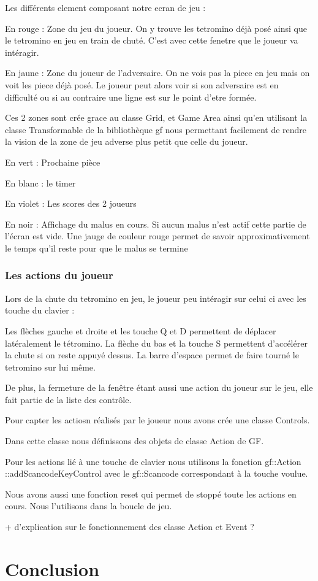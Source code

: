 \documentclass[a4paper, 12pt]{article}
\begin{document}
			Les différents element composant notre ecran de jeu : 

			En rouge : Zone du jeu du joueur. On y trouve les tetromino déjà posé ainsi que le tetromino en jeu en train de chuté. C’est avec cette fenetre que le joueur va intéragir.

			En jaune : Zone du joueur de l’adversaire. On ne vois pas la piece en jeu mais on voit les piece déjà posé. Le joueur peut alors voir si son adversaire est en difficulté ou si au contraire une ligne est sur le point d’etre formée.


			Ces 2 zones sont crée grace au classe Grid, et Game Area ainsi qu’en utilisant la classe Transformable de la bibliothèque gf nous permettant facilement de rendre la vision de la zone de jeu adverse plus petit que celle du joueur.

			En vert : Prochaine pièce

			En blanc : le timer

			En violet : Les scores des 2 joueurs

			En noir : Affichage du malus en cours. Si aucun malus n’est actif cette partie de l’écran est vide. Une jauge de couleur rouge permet de savoir approximativement le temps qu’il reste pour que le malus se termine




		\subsubsection{Les actions du joueur}

			Lors de la chute du tetromino en jeu, le joueur peu intéragir sur celui ci avec les touche du clavier :

			Les flèches gauche et droite et les touche Q et D permettent de déplacer latéralement le tétromino.
			La flèche du bas et la touche S permettent d’accélérer la chute si on reste appuyé dessus.
			La barre d’espace permet de faire tourné le tetromino sur lui même.

			De plus, la fermeture de la fenêtre étant aussi une action du joueur sur le jeu, elle fait partie de la liste des contrôle.


			Pour capter les actiosn réalisés par le joueur nous avons crée une classe Controls.

			Dans cette classe nous définissons des objets de classe Action de GF.

			Pour les actions lié à une touche de clavier nous utilisons la fonction gf::Action ::addScancodeKeyControl avec le gf::Scancode correspondant à la touche voulue.

			Nous avons aussi une fonction reset qui permet de stoppé toute les actions en cours. Nous l’utilisons dans la boucle de jeu.

			+ d’explication sur le fonctionnement des classe Action et Event ?

		
	

\section*{Conclusion}
\end{document}
